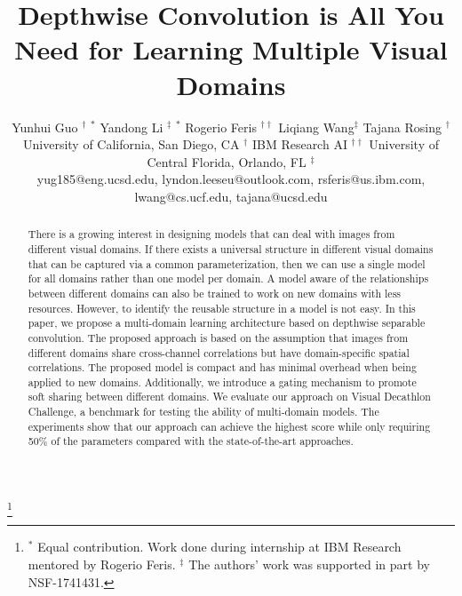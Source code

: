 \documentclass[letterpaper]{article} \usepackage{aaai19}  \usepackage{times}  \usepackage{helvet}  \usepackage{courier}  \usepackage{url}  \usepackage{graphicx}  \usepackage{amssymb}
\begin{document}
\title{Depthwise Convolution is All You Need for Learning Multiple Visual Domains}
\author{Yunhui Guo $^{\dagger}$ $^{*}$ \quad  Yandong Li $^{\ddagger}$ $^{*}$ 
\quad  Rogerio Feris $^{\dagger\dagger}$  \quad Liqiang Wang$^{\ddagger}$ \quad Tajana Rosing $^{\dagger}$ \\
{University of California, San Diego, CA} $^{\dagger}$  
\quad IBM Research AI $^{\dagger\dagger}$
\quad University of Central Florida,
Orlando, FL $^{\ddagger}$  \\
yug185@eng.ucsd.edu, lyndon.leeseu@outlook.com,
rsferis@us.ibm.com,
lwang@cs.ucf.edu,
tajana@ucsd.edu}
\maketitle
\begin{abstract}
There is a growing interest in designing models that can deal with images from different visual domains. If there exists a universal structure in different visual domains that can be captured via a common parameterization, then we can use a single model for all domains rather than one model per domain. A model aware of the relationships between different
domains can also be trained to work on new domains
with less resources. However, to identify the reusable structure in a model is not easy. In this paper, we propose a multi-domain learning architecture based on depthwise separable convolution. The proposed approach is based on the assumption that images from different domains share cross-channel correlations but have domain-specific spatial correlations. The proposed model is compact and has minimal overhead when being applied to new domains. Additionally, we introduce a gating mechanism to promote soft sharing between different domains. We evaluate our approach on Visual Decathlon Challenge, a benchmark for testing the ability of multi-domain models. The experiments show that our approach can achieve the highest score while only requiring 50\% of the parameters compared with the state-of-the-art approaches.
\end{abstract}
\let\thefootnote\relax\footnote{$^{*}$ Equal contribution. Work done during internship at IBM Research mentored by Rogerio Feris. $^{\ddagger}$ The authors' work was supported in part by NSF-1741431.}
\end{document}
